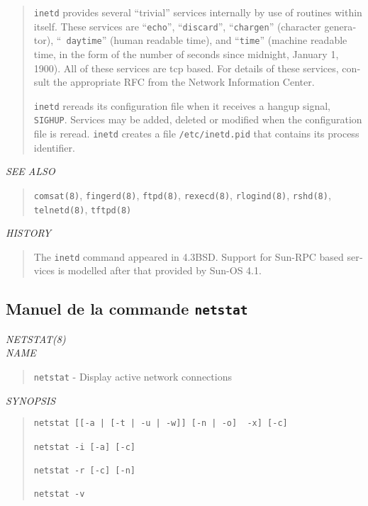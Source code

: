 \begin{appendix}
\begin{english}
\begin{quote}
	{\tt inetd} provides several ``trivial'' services internally by use
	of routines within itself. These services are ``{\tt echo}'',
	``{\tt discard}'', ``{\tt chargen}'' (character generator), ``{\tt
	daytime}'' (human readable time), and ``{\tt time}'' (machine
	readable time, in the form of the number of seconds since midnight,
	January 1, 1900). All of these services are tcp based. For details
	of these services, consult the appropriate RFC from the Network
	Information Center.

	{\tt inetd} rereads its configuration file when it receives a hangup
	signal, {\tt SIGHUP}. Services may be added, deleted or modified
	when the configuration file is reread. {\tt inetd} creates a file
	{\tt /etc/inetd.pid} that contains its process identifier.
\end{quote}

{\sl SEE ALSO}
\begin{quote}
	{\tt comsat(8)}, {\tt fingerd(8)}, {\tt ftpd(8)}, {\tt rexecd(8)},
	{\tt rlogind(8)}, {\tt rshd(8)}, {\tt telnetd(8)}, {\tt tftpd(8)}
\end{quote}

{\sl HISTORY}
\begin{quote}
	The {\tt inetd} command appeared in 4.3BSD. Support for Sun-RPC based
	services is modelled after that provided by Sun-OS 4.1.
\end{quote}
\end{english}

\subsection{Manuel de la commande {\tt netstat}}
\begin{english}
{\sl NETSTAT(8)}\\

{\sl NAME}
\begin{quote}
	{\tt netstat} - Display active network connections
\end{quote}

{\sl SYNOPSIS}
\begin{quote}
\begin{verbatim}
netstat [[-a | [-t | -u | -w]] [-n | -o]  -x] [-c]

netstat -i [-a] [-c]

netstat -r [-c] [-n]

netstat -v
\end{verbatim}
\end{quote}


\end{english}
\end{appendix}

